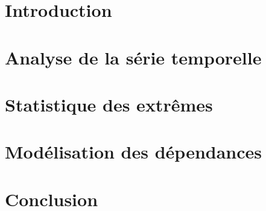 \documentclass[11pt,letterpaper]{article}
\begin{document}



\pagebreak
\tableofcontents

\pagebreak
\section{Introduction}


\pagebreak
\section{Analyse de la série temporelle}


\pagebreak
\section{Statistique des extrêmes}


\pagebreak
\section{Modélisation des dépendances}



\pagebreak
\section{Conclusion}



\pagebreak
\nocite{*}


\end{document}
